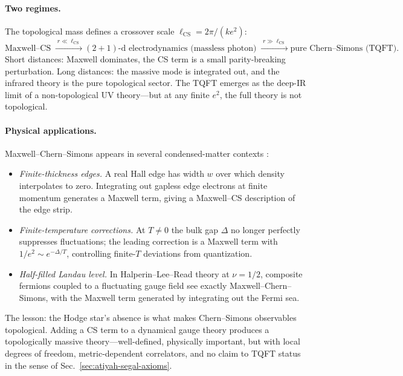 \paragraph{Two regimes.}
The topological mass defines a crossover scale $\ell_{\mathrm{CS}} = 2\pi/(ke^{2})$:
\begin{equation}
  \text{Maxwell--CS}
  \;\xrightarrow{\;r \ll \ell_{\mathrm{CS}}\;}
  \text{$(2{+}1)$-d electrodynamics (massless photon)}
  \;\xrightarrow{\;r \gg \ell_{\mathrm{CS}}\;}
  \text{pure Chern--Simons (TQFT)}.
  \label{eq:mcs-crossover}
\end{equation}
Short distances: Maxwell dominates, the CS term is a small parity-breaking perturbation. Long distances: the massive mode is integrated out, and the infrared theory is the pure topological sector. The TQFT emerges as the deep-IR limit of a non-topological UV theory---but at any finite $e^{2}$, the full theory is not topological.

\paragraph{Physical applications.}
Maxwell--Chern--Simons appears in several condensed-matter contexts \cite{Wen1995TopologicalOrdersEdgeExcitations,Dunne1999AspectsCS}:
\begin{itemize}
  \item \emph{Finite-thickness edges.} A real Hall edge has width $w$ over which density interpolates to zero. Integrating out gapless edge electrons at finite momentum generates a Maxwell term, giving a Maxwell--CS description of the edge strip.
  \item \emph{Finite-temperature corrections.} At $T\neq 0$ the bulk gap $\Delta$ no longer perfectly suppresses fluctuations; the leading correction is a Maxwell term with $1/e^{2}\sim e^{-\Delta/T}$, controlling finite-$T$ deviations from quantization.
  \item \emph{Half-filled Landau level.} In Halperin--Lee--Read theory at $\nu=1/2$, composite fermions coupled to a fluctuating gauge field see exactly Maxwell--Chern--Simons, with the Maxwell term generated by integrating out the Fermi sea.
\end{itemize}

The lesson: the Hodge star's absence is what makes Chern--Simons observables topological. Adding a CS term to a dynamical gauge theory produces a topologically massive theory---well-defined, physically important, but with local degrees of freedom, metric-dependent correlators, and no claim to TQFT status in the sense of Sec.~\ref{sec:atiyah-segal-axioms}.

